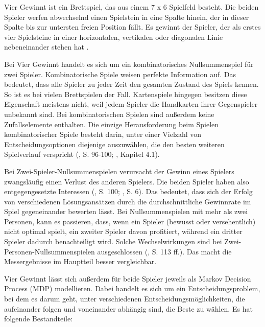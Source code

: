 \label{vier-gewinnt}

Vier Gewinnt ist ein Brettspiel, das aus einem 7 x 6 Spielfeld besteht. Die beiden Spieler werfen abwechselnd einen Spielstein in eine Spalte hinein, der in dieser Spalte bis zur untersten freien Position fällt. Es gewinnt der Spieler, der als erstes vier Spielsteine in einer horizontalen, vertikalen oder diagonalen Linie nebeneinander stehen hat \cite{MiltonBradleyCompany.1990}.

Bei Vier Gewinnt handelt es sich um ein kombinatorisches Nullsummenspiel für zwei Spieler. Kombinatorische Spiele weisen \glqq perfekte Information\grqq{} auf. Das bedeutet, dass alle Spieler zu jeder Zeit den gesamten Zustand des Spiels kennen. So ist es bei vielen Brettspielen der Fall. Kartenspiele hingegen besitzen diese Eigenschaft meistens nicht, weil jedem Spieler die Handkarten ihrer Gegenspieler unbekannt sind. Bei kombinatorischen Spielen sind außerdem keine Zufallselemente enthalten. Die einzige Herausforderung beim Spielen kombinatorischer Spiele besteht darin, unter einer Vielzahl von Entscheidungsoptionen diejenige auszuwählen, die den besten weiteren Spielverlauf verspricht (\cite{Bewersdorff.2018}, S. 96-100; \cite{Ferguson.January2019}, Kapitel 4.1).

Bei Zwei-Spieler-Nullsummenspielen verursacht der Gewinn eines Spielers zwangsläufig einen Verlust des anderen Spielers. Die beiden Spieler haben also entgegengesetzte Interessen (\cite{Bewersdorff.2018}, S. 100; \cite{Allis.1994}, S. 6). Das bedeutet, dass sich der Erfolg von verschiedenen Lösungsansätzen durch die durchschnittliche Gewinnrate im Spiel gegeneinander bewerten lässt. Bei Nullsummenspielen mit mehr als zwei Personen, kann es passieren, dass, wenn ein Spieler (bewusst oder versehentlich) nicht optimal spielt, ein zweiter Spieler davon profitiert, während ein dritter Spieler dadurch benachteiligt wird. Solche Wechselwirkungen sind bei Zwei-Personen-Nullsummenspielen ausgeschlossen (\cite{Bewersdorff.2018}, S. 113 ff.). Das macht die Messergebnisse im Hauptteil besser vergleichbar.

Vier Gewinnt lässt sich außerdem für beide Spieler jeweils als Markov Decision Process (MDP) modellieren. Dabei handelt es sich um ein Entscheidungsproblem, bei dem es darum geht, unter verschiedenen Entscheidungsmöglichkeiten, die aufeinander folgen und voneinander abhängig sind, die Beste zu wählen. Es hat folgende Bestandteile:

